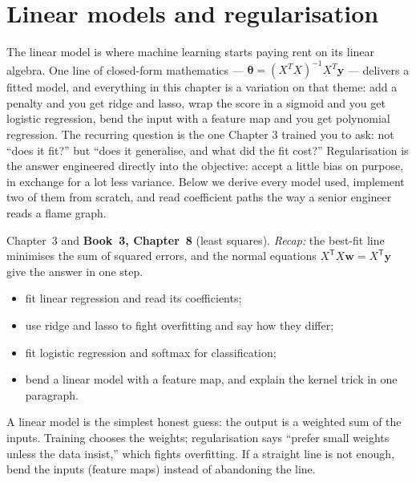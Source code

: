\chapter{Linear models and regularisation}\label{ch:linear}

The linear model is where machine learning starts paying rent on its linear
algebra. One line of closed-form mathematics --- $\boldsymbol\theta =
(X^TX)^{-1}X^T\mathbf{y}$ --- delivers a fitted model, and everything in this
chapter is a variation on that theme: add a penalty and you get ridge and
lasso, wrap the score in a sigmoid and you get logistic regression, bend the
input with a feature map and you get polynomial regression. The recurring
question is the one Chapter 3 trained you to ask: not ``does it fit?'' but
``does it generalise, and what did the fit cost?'' Regularisation is the
answer engineered directly into the objective: accept a little bias on
purpose, in exchange for a lot less variance. Below we
derive every model used, implement two of them from scratch, and read
coefficient paths the way a senior engineer reads a flame graph.

\begin{rulebox}
Chapter~3 and \textbf{Book~3, Chapter~8} (least squares). \emph{Recap:} the best-fit line minimises the sum of squared errors, and the normal equations $X^{\mathsf T}X\mathbf w=X^{\mathsf T}\mathbf y$ give the answer in one step.
\end{rulebox}
\begin{wins}
\begin{itemize}
\item fit linear regression and read its coefficients;
\item use ridge and lasso to fight overfitting and say how they differ;
\item fit logistic regression and softmax for classification;
\item bend a linear model with a feature map, and explain the kernel trick in one paragraph.
\end{itemize}
\end{wins}
\begin{principle}
A linear model is the simplest honest guess: the output is a weighted sum of the inputs. Training chooses the weights; regularisation says ``prefer small weights unless the data insist,'' which fights overfitting. If a straight line is not enough, bend the inputs (feature maps) instead of abandoning the line.
\end{principle}

